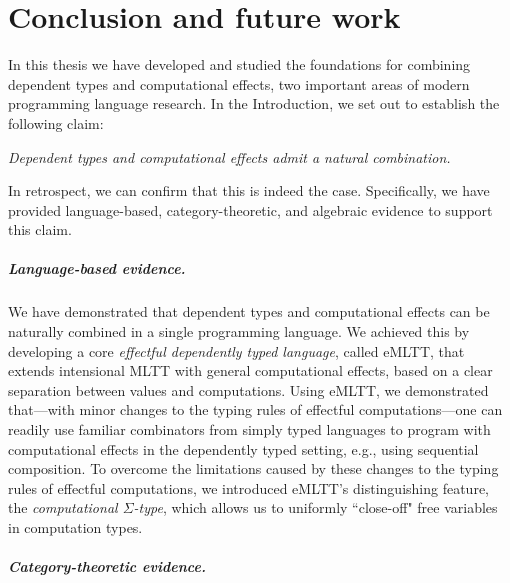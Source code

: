 
\chapter{Conclusion and future work}
\label{chap:conclusions}

In this thesis we have developed and studied the foundations for combining dependent types and computational effects, two important areas of modern programming language research. In the Introduction, we set out to establish the following claim:
\begin{displayquote}
\vspace{0.15cm}
\textit{Dependent types and computational effects admit a natural combination.}
\end{displayquote}
In retrospect, we can confirm that this is indeed the case. Specifically, we have provided language-based, category-theoretic, and algebraic evidence to support this claim.

\paragraph*{Language-based evidence.}

We have demonstrated that dependent types and computational effects can be naturally combined in a single programming language.
We achieved this by developing a core \emph{effectful dependently typed language}, called eMLTT, that extends intensional MLTT with general computational effects, based on a clear separation between values and computations.
Using eMLTT, we demonstrated that---with minor changes to the typing rules of effectful computations---one can readily use familiar combinators from simply typed languages to program with computational effects in the dependently typed setting, e.g., using sequential composition.
To overcome the limitations caused by these changes to the typing rules of effectful computations,
we introduced eMLTT's distinguishing feature, the \emph{computational $\Sigma$-type}, 
which allows us to uniformly ``close-off" free variables in computation types. 

\paragraph*{Category-theoretic evidence.}

